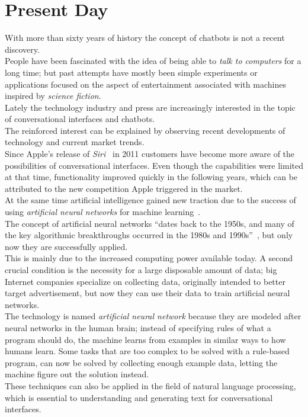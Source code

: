 \section{Present Day}
\label{presentday}


With more than sixty years of history the concept of chatbots is not a recent discovery.
\\
People have been fascinated with the idea of being able to \emph{talk to computers} for a long time;
but past attempts have mostly been simple experiments or applications focused on the aspect of entertainment associated with machines inspired by \emph{science fiction}.
\\

Lately the technology industry and press are increasingly interested in the topic of conversational interfaces and chatbots.
\\
The reinforced interest can be explained by observing recent developments of technology and current market trends.
\\

Since Apple's release of \emph{Siri}~\cite{iphonelaunch} in 2011 customers have become more aware of the possibilities of conversational interfaces.
Even though the capabilities were limited at that time,
functionality improved quickly in the following years,
which can be attributed to the new competition Apple triggered in the market.
\\

At the same time artificial intelligence gained new traction due to the success of using \emph{artificial neural networks} for machine learning~\cite{mltrend}.
\\

The concept of artificial neural networks ``dates back to the 1950s, and many of the key algorithmic breakthroughs occurred in the 1980s and 1990s''~\cite{airevolution},
but only now they are successfully applied.
\\
This is mainly due to the increased computing power available today.
A second crucial condition is the necessity for a large disposable amount of data;
big Internet companies specialize on collecting data, originally intended to better target advertisement,
but now they can use their data to train artificial neural networks.
\\
The technology is named \emph{artificial neural network} because they are modeled after neural networks in the human brain;
instead of specifying rules of what a program should do, the machine learns from examples in similar ways to how humans learn.
Some tasks that are too complex to be solved with a rule-based program, can now be solved by collecting enough example data,
letting the machine figure out the solution instead.
\\
These techniques can also be applied in the field of natural language processing,
which is essential to understanding and generating text for conversational interfaces.
\\

